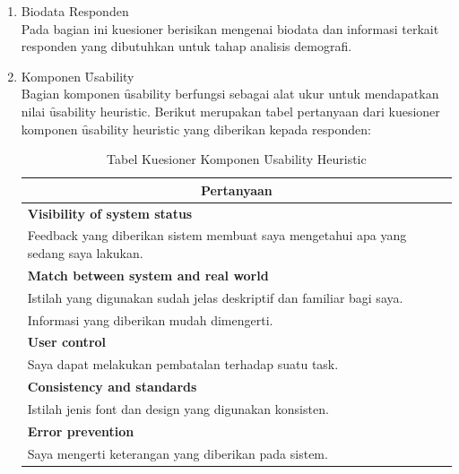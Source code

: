 \begin{enumerate}
	\item Biodata Responden\\
	Pada bagian ini kuesioner berisikan mengenai biodata dan informasi terkait responden yang dibutuhkan untuk tahap analisis demografi.
	\item Komponen \f{Usability}\\
	Bagian komponen \f{usability} berfungsi sebagai alat ukur untuk mendapatkan nilai \f{usability heuristic}. Berikut merupakan tabel pertanyaan dari kuesioner komponen \f{usability heuristic} yang diberikan kepada responden:
	\begin{table}[h]
		\centering
		\caption{Tabel Kuesioner Komponen \f{Usability Heuristic} }
		\begin{tabular}{|p{11.2cm}|}
			\hline
			\multicolumn{1}{|c|}{{\bf Pertanyaan}}\\  
			\hline
			{\bf Visibility of system status}                                                                           \\
			Feedback yang diberikan sistem membuat saya mengetahui apa yang sedang saya lakukan.                        \\ \hline
			{\bf Match between system and real world}                                                                   \\
			Istilah yang digunakan sudah jelas deskriptif dan familiar bagi saya.                                       \\
			Informasi yang diberikan mudah dimengerti.                                                                  \\ \hline
			{\bf User control}                                                                                          \\
			Saya dapat melakukan pembatalan terhadap suatu task.                                                        \\ \hline
			{\bf Consistency and standards}                                                                             \\
			Istilah jenis font dan design yang digunakan konsisten.                                                     \\ \hline
			{\bf Error prevention}                                                                                      \\
			Saya mengerti keterangan yang diberikan pada sistem.                                                        \\

\end{tabular}
\end{table}
\end{enumerate}
